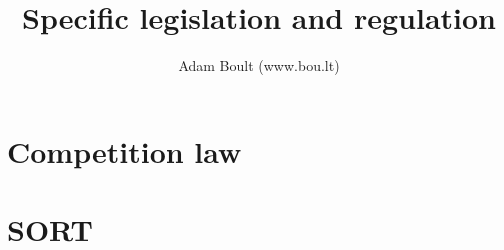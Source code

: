 \documentclass[oneside]{book}
\begin{document}
\author{Adam Boult (www.bou.lt)}
\title{Specific legislation and regulation}
\maketitle

\setcounter{tocdepth}{0}
\tableofcontents



\part{Competition law}




\part{SORT}

\end{document}
